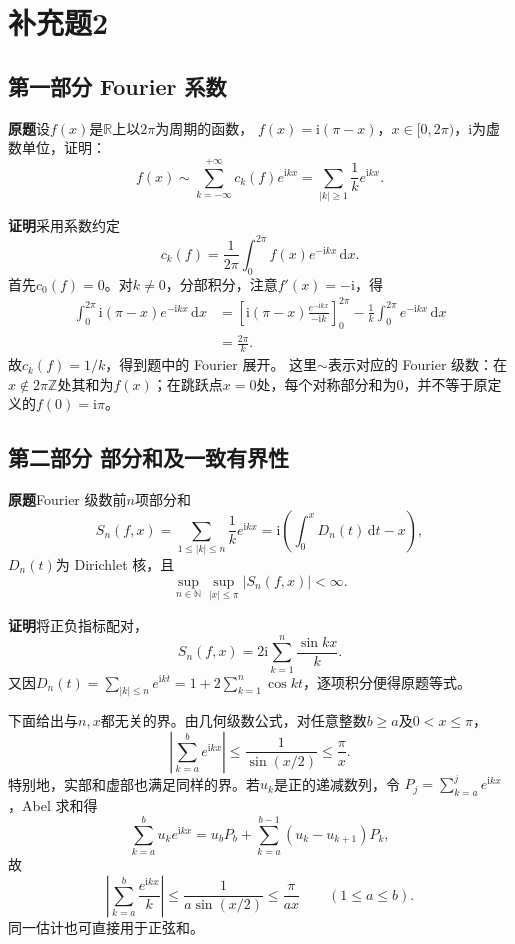 \documentclass[11pt,a4paper]{ctexart}
\newcommand{\N}{\mathbb N}
\newcommand{\R}{\mathbb R}
\newcommand{\ii}{\mathrm i}
\newcommand{\dd}{\,\mathrm d}
\newcommand{\proofstart}{\par\noindent\textbf{证明}\quad}
\begin{document}
\section{补充题2}
\subsection*{第一部分 Fourier 系数}
\noindent\textbf{原题}\quad 设$f(x)$是$\R$上以$2\pi$为周期的函数，
$f(x)=\ii(\pi-x)$，$x\in[0,2\pi)$，$\ii$为虚数单位，证明：
\[
 f(x)\sim\sum_{k=-\infty}^{+\infty}c_k(f)e^{\ii kx}
 =\sum_{|k|\ge1}\frac1k e^{\ii kx}.
\]

\proofstart 采用系数约定
\[
 c_k(f)=\frac1{2\pi}\int_0^{2\pi}f(x)e^{-\ii kx}\dd x.
\]
首先$c_0(f)=0$。对$k\ne0$，分部积分，注意$f'(x)=-\ii$，得
\begin{align*}
 \int_0^{2\pi}\ii(\pi-x)e^{-\ii kx}\dd x
 &=\left[\ii(\pi-x)\frac{e^{-\ii kx}}{-\ii k}\right]_0^{2\pi}
 -\frac1k\int_0^{2\pi}e^{-\ii kx}\dd x\\
 &=\frac{2\pi}{k}.
\end{align*}
故$c_k(f)=1/k$，得到题中的 Fourier 展开。
这里$\sim$表示对应的 Fourier 级数：在$x\notin2\pi\mathbb Z$处其和为$f(x)$；在跳跃点$x=0$处，每个对称部分和为$0$，并不等于原定义的$f(0)=\ii\pi$。

\subsection*{第二部分 部分和及一致有界性}
\noindent\textbf{原题}\quad Fourier 级数前$n$项部分和
\[
 S_n(f,x)=\sum_{1\le|k|\le n}\frac1k e^{\ii kx}
 =\ii\left(\int_0^xD_n(t)\dd t-x\right),
\]
$D_n(t)$为 Dirichlet 核，且
\[
 \sup_{n\in\N}\sup_{|x|\le\pi}|S_n(f,x)|<\infty.
\]

\proofstart 将正负指标配对，
\[
 S_n(f,x)=2\ii\sum_{k=1}^{n}\frac{\sin kx}{k}.
\]
又因$D_n(t)=\sum_{|k|\le n}e^{\ii kt}=1+2\sum_{k=1}^n\cos kt$，逐项积分便得原题等式。

下面给出与$n,x$都无关的界。由几何级数公式，对任意整数$b\ge a$及$0<x\le\pi$，
\begin{equation}\label{eq:geom}
 \left|\sum_{k=a}^{b}e^{\ii kx}\right|
 \le\frac1{\sin(x/2)}\le\frac\pi x.
\end{equation}
特别地，实部和虚部也满足同样的界。若$u_k$是正的递减数列，令
$P_j=\sum_{k=a}^j e^{\ii kx}$，Abel 求和得
\[
 \sum_{k=a}^{b}u_ke^{\ii kx}
 =u_bP_b+\sum_{k=a}^{b-1}(u_k-u_{k+1})P_k,
\]
故
\begin{equation}\label{eq:block}
 \left|\sum_{k=a}^{b}\frac{e^{\ii kx}}{k}\right|
 \le\frac1{a\sin(x/2)}\le\frac\pi{ax}\qquad(1\le a\le b).
\end{equation}
同一估计也可直接用于正弦和。
\end{document}
